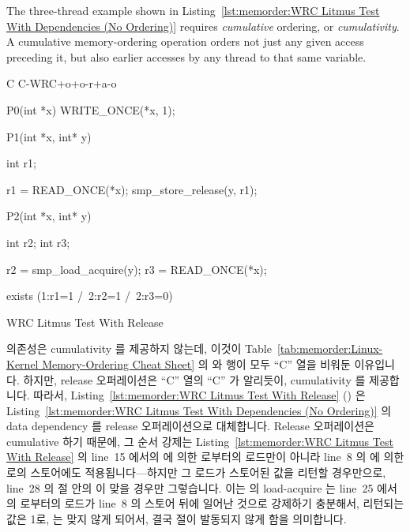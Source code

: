 The three-thread example shown in
Listing~\ref{lst:memorder:WRC Litmus Test With Dependencies (No Ordering)}
requires \emph{cumulative} ordering, or \emph{cumulativity}.
A cumulative memory-ordering operation orders not just any given
access preceding it, but also earlier accesses by any thread to that
same variable.
\fi

\begin{listing}[tbp]
{ \scriptsize
\begin{verbbox}[\LstLineNo]
C C-WRC+o+o-r+a-o

{
}

P0(int *x)
{
  WRITE_ONCE(*x, 1);
}

P1(int *x, int* y)
{
  int r1;

  r1 = READ_ONCE(*x);
  smp_store_release(y, r1);
}

P2(int *x, int* y)
{
  int r2;
  int r3;

  r2 = smp_load_acquire(y);
  r3 = READ_ONCE(*x);
}

exists (1:r1=1 /\ 2:r2=1 /\ 2:r3=0)
\end{verbbox}
}
\centering
\theverbbox
\caption{WRC Litmus Test With Release}
\label{lst:memorder:WRC Litmus Test With Release}
\end{listing}

의존성은 cumulativity 를 제공하지 않는데, 이것이
Table~\ref{tab:memorder:Linux-Kernel Memory-Ordering Cheat Sheet} 의
 와  행이 모두 ``C'' 열을 비워둔
이유입니다.
하지만, release 오퍼레이션은 ``C'' 열의 ``C'' 가 알리듯이, cumulativity 를
제공합니다.
따라서,
Listing~\ref{lst:memorder:WRC Litmus Test With Release}
()
은
Listing~\ref{lst:memorder:WRC Litmus Test With Dependencies (No Ordering)}
의 data dependency 를 release 오퍼레이션으로 대체합니다.
Release 오퍼레이션은 cumulative 하기 때문에, 그 순서 강제는
Listing~\ref{lst:memorder:WRC Litmus Test With Release} 의 line~15 에서의
 에 의한  로부터의 로드만이 아니라 line~8 의  에 의한
 로의 스토어에도 적용됩니다---하지만 그 로드가 스토어된 값을 리턴할
경우만으로, line~28 의  절 안의  이 맞을 경우만
그렇습니다.
이는  의 load-acquire 는 line~25 에서의  로부터의 로드가 line~8
의 스토어 뒤에 일어난 것으로 강제하기 충분해서, 리턴되는 값은 1로, 
는 맞지 않게 되어서, 결국  절이 발동되지 않게 함을 의미합니다.
\iffalse

